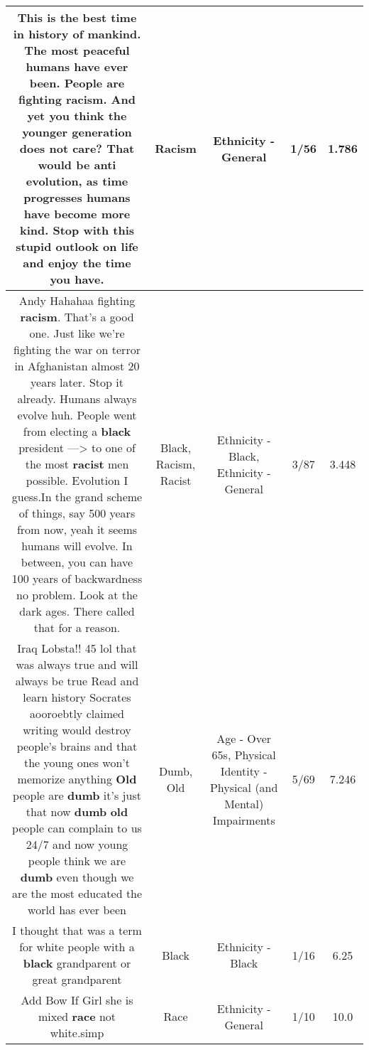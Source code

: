 \documentclass[11pt]{article}
\newlength\mylength
\begin{document}
\begin{center}
\begin{longtable}{|C{.65\mylength}|C{.30\mylength}|C{.12\mylength}|C{.12\mylength}|C{.12\mylength}|}
  \small This is the best time in history of mankind. The most peaceful humans have ever been. People are fighting \textbf{racism}. And yet you think the younger generation does not care? That would be anti evolution, as time progresses humans have become more kind. Stop with this stupid outlook on life and enjoy the time you have.\normalsize   & Racism & Ethnicity - General & 1/56 & 1.786 \\  \hline
  \small Andy Hahahaa fighting \textbf{racism}. That's a good one. Just like we're fighting the war on terror in Afghanistan almost 20 years later. Stop it already. Humans always evolve huh. People went from electing a \textbf{black} president —> to one of the most \textbf{racist} men possible. Evolution I guess.In the grand scheme of things, say 500 years from now, yeah it seems humans will evolve. In between, you can have 100 years of backwardness no problem. Look at the dark ages. There called that for a reason.\normalsize   & Black, Racism, Racist & Ethnicity - Black, Ethnicity - General & 3/87 & 3.448 \\  \hline
  \small Iraq Lobsta!! 45 lol that was always true and will always be true Read and learn history Socrates aooroebtly claimed writing would destroy people's brains and that the young ones won't memorize anything \textbf{Old} people are \textbf{dumb} it's just that now \textbf{dumb} \textbf{old} people can complain to us 24/7 and now young people think we are \textbf{dumb} even though we are the most educated the world has ever been\normalsize   & Dumb, Old & Age - Over 65s, Physical Identity - Physical (and Mental) Impairments & 5/69 & 7.246 \\  \hline
  \small I thought that was a term for white people with a \textbf{black} grandparent or great grandparent\normalsize   & Black & Ethnicity - Black & 1/16 & 6.25 \\  \hline
  \small Add Bow If Girl she is mixed \textbf{race} not white.simp\normalsize   & Race & Ethnicity - General & 1/10 & 10.0 \\  \hline

\end{longtable}
\end{center}
\end{document}
